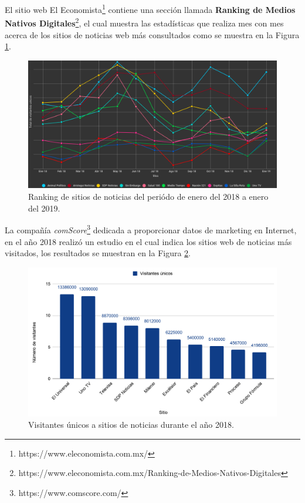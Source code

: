 El sitio web El Economista\footnote{https://www.eleconomista.com.mx/} contiene una sección llamada \textbf{Ranking de Medios Nativos Digitales}\footnote{https://www.eleconomista.com.mx/Ranking-de-Medios-Nativos-Digitales}, el cual muestra las estadísticas que realiza mes con mes acerca de los sitios de noticias web más consultados como se muestra en la Figura \ref{fig:rank}.\\

\begin{figure}[H]
  \centering
  \includegraphics[scale=.25]{imagenes/Capitulo5/ranking.png}
  \caption{Ranking de sitios de noticias del periódo de enero del 2018 a enero del 2019.}
  \label{fig:rank}
\end{figure}

La compañía \textit{comScore}\footnote{https://www.comscore.com/} dedicada a proporcionar datos de marketing en Internet, en el año 2018 realizó un estudio en el cual indica los sitios web de noticias más visitados, los resultados se muestran en la Figura \ref{fig:comScore}.

\begin{figure}[H]
  \centering
  \includegraphics[scale=.32]{imagenes/Capitulo5/visitantesPorSitioComScore.png}
  \caption{Visitantes únicos a sitios de noticias durante el año 2018.}
  \label{fig:comScore}
\end{figure}

